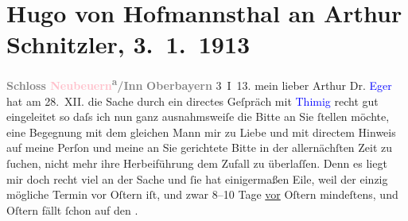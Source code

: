 

               \section[Hugo von Hofmannsthal an Arthur Schnitzler, 3. 1. 1913]{ Hugo von Hofmannsthal an Arthur Schnitzler, 3. 1. 1913}\nopagebreak{}\rehead{ }\normalsize\beginnumbering{} \toendnotes[C]{\smallbreak\pagebreak[2]} 
\toendnotes[C]{\smallbreak}\pstart
           \noindent{}{\pb}\textcolor{gray}{\textbf{Schloss \textcolor{pink}{Neubeuern}{}\ledrightnote{\textcolor{pink}{Neubeuern}}{ }\textsuperscript{a}/Inn}}\pend
           \pstart
           \textcolor{gray}{\textbf{Oberbayern}}\pend
           \pstart
           \raggedleft{}3 I 13.\pend
           \pstart{}mein lieber Arthur \pend\pstart
           Dr. \textcolor{blue}{Eger}{}\ledrightnote{\textcolor{blue}{Paul Eger}} hat am 28. XII. die Sache
               durch ein directes Geſpräch mit \textcolor{blue}{Thimig}{}\ledrightnote{\textcolor{blue}{Hugo Thimig}} recht gut
               eingeleitet so daſs ich nun ganz ausnahmsweiſe die  Bitte an Sie ſtellen möchte, eine Begegnung mit dem gleichen Mann
               mir zu Liebe und mit directem Hinweis auf meine Perſon und meine an Sie gerichtete
               Bitte in der allernächſten Zeit zu ſuchen, nicht mehr ihre Herbeiführung dem Zufall
               zu überlaſſen. Denn es liegt mir doch recht viel an der Sache und ſie hat
               einigermaßen Eile, weil der einzig mögliche Termin vor Oſtern iſt, und
               zwar 8–10 Tage \uline{vor}{ }Oſtern mindeſtens, und Oſtern fällt ſchon auf den \label{K_L02112_1v}\label{K_L02112_1h}.\pend
